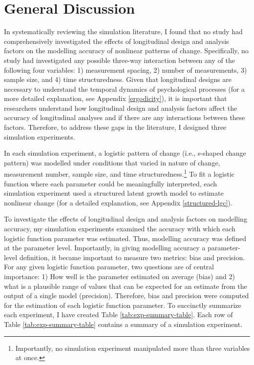 \documentclass[
12pt, %
twoside,
english]{guelphthesis}
\begin{document}
\hypertarget{general-discussion}{%
\chapter{General Discussion}\label{general-discussion}}

In systematically reviewing the simulation literature, I found that no study had comprehensively investigated the effects of longitudinal design and
analysis factors on the modelling accuracy of nonlinear patterns of change. Specifically, no study had investigated any possible three-way interaction between any of the following four variables: 1) measurement spacing, 2) number of measurements, 3) sample size, and 4) time structuredness. Given that longitudinal designs are necessary to understand the temporal dynamics of psychological processes (for a more detailed explanation, see Appendix \ref{ergodicity}), it is important that researchers understand how longitudinal design and analysis factors affect the accuracy of longitudinal analyses and if there are any interactions between these factors. Therefore, to address these gaps in the literature, I designed three simulation experiments.

In each simulation experiment, a logistic pattern of change (i.e., s-shaped change pattern) was modelled under conditions that varied in nature of change, measurement number, sample size, and time structuredness.\footnote{Importantly, no simulation experiment manipulated more than three variables at once.} To fit a logistic function where each parameter could be meaningfully interpreted, each simulation experiment used a structured latent growth model to estimate nonlinear change (for a detailed explanation, see Appendix \ref{structured-lgc}).

To investigate the effects of longitudinal design and analysis factors on modelling accuracy, my simulation experiments examined the accuracy with which each logistic function parameter was estimated. Thus, modelling accuracy was defined at the parameter level. Importantly, in giving modelling accuracy a parameter-level definition, it became important to measure two metrics: bias and precision. For any given logistic function parameter, two questions are of central importance: 1) How well is the parameter estimated on average (bias) and 2) what is a plausible range of values that can be expected for an estimate from the output of a single model (precision). Therefore, bias and precision were computed for the estimation of each logistic function parameter. To succinctly summarize each experiment, I have created Table \ref{tab:exp-summary-table}. Each row of Table \ref{tab:exp-summary-table} contains a summary of a simulation experiment.
\end{document}
